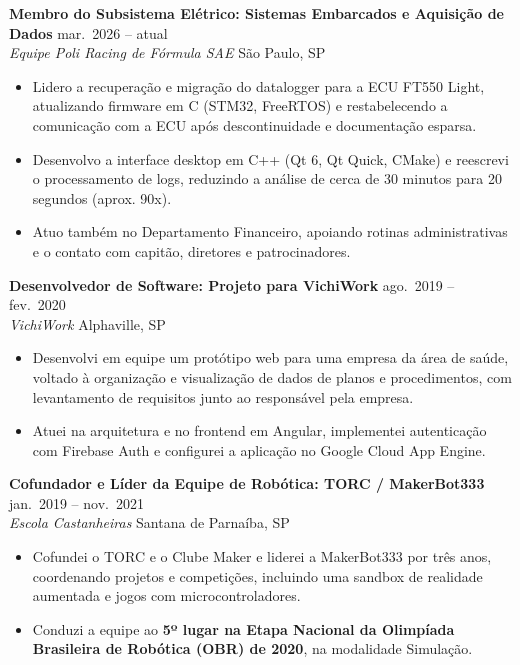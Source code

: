 \documentclass[10pt,a4paper]{article}
\newcommand{\entry}[4]{%
  \textbf{#1} \hfill {\small #3}\\
  {\itshape\color{subgray} #2} \hfill {\small\color{subgray}#4}\par
}
\begin{document}
\entry{Membro do Subsistema Elétrico: Sistemas Embarcados e Aquisição de Dados}{Equipe Poli Racing de Fórmula SAE}{mar.\ 2026 -- atual}{São Paulo, SP}
\begin{itemize}
  \item Lidero a recuperação e migração do datalogger para a ECU FT550 Light, atualizando firmware em C (STM32, FreeRTOS) e restabelecendo a comunicação com a ECU após descontinuidade e documentação esparsa.
  \item Desenvolvo a interface desktop em C++ (Qt 6, Qt Quick, CMake) e reescrevi o processamento de logs, reduzindo a análise de cerca de 30 minutos para 20 segundos (aprox. 90x).
  \item Atuo também no Departamento Financeiro, apoiando rotinas administrativas e o contato com capitão, diretores e patrocinadores.
\end{itemize}

\vspace{2pt}
\entry{Desenvolvedor de Software: Projeto para VichiWork}{VichiWork}{ago.\ 2019 -- fev.\ 2020}{Alphaville, SP}
\begin{itemize}
  \item Desenvolvi em equipe um protótipo web para uma empresa da área de saúde, voltado à organização e visualização de dados de planos e procedimentos, com levantamento de requisitos junto ao responsável pela empresa.
  \item Atuei na arquitetura e no frontend em Angular, implementei autenticação com Firebase Auth e configurei a aplicação no Google Cloud App Engine.
\end{itemize}


\vspace{2pt}
\entry{Cofundador e Líder da Equipe de Robótica: TORC / MakerBot333}{Escola Castanheiras}{jan.\ 2019 -- nov.\ 2021}{Santana de Parnaíba, SP}
\begin{itemize}
  \item Cofundei o TORC e o Clube Maker e liderei a MakerBot333 por três anos, coordenando projetos e competições, incluindo uma sandbox de realidade aumentada e jogos com microcontroladores.
  \item Conduzi a equipe ao \textbf{5º lugar na Etapa Nacional da Olimpíada Brasileira de Robótica (OBR) de 2020}, na modalidade Simulação.
\end{itemize}
\end{document}
